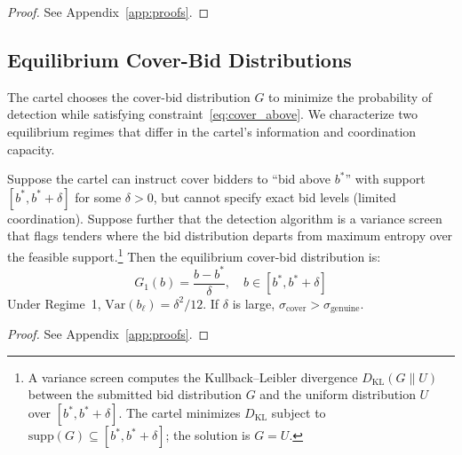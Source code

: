 \begin{proof}
See Appendix~\ref{app:proofs}.
\end{proof}


\subsection{Equilibrium Cover-Bid Distributions}
\label{sec:cover_distributions}

The cartel chooses the cover-bid distribution $G$ to minimize the
probability of detection while satisfying
constraint~\eqref{eq:cover_above}. We characterize two equilibrium
regimes that differ in the cartel's information and coordination
capacity.

\begin{proposition}
\label{prop:regime1}
Suppose the cartel can instruct cover bidders to ``bid above $b^*$''
with support $[b^*, b^* + \delta]$ for some $\delta > 0$, but cannot
specify exact bid levels (limited coordination). Suppose further that
the detection algorithm is a variance screen that flags tenders where
the bid distribution departs from maximum entropy over the feasible
support.\footnote{A variance screen computes the Kullback--Leibler
divergence $D_{\text{KL}}(G \| U)$ between the submitted bid
distribution $G$ and the uniform distribution $U$ over $[b^*, b^* +
\delta]$. The cartel minimizes $D_{\text{KL}}$ subject to
$\text{supp}(G) \subseteq [b^*, b^* + \delta]$; the solution is
$G = U$.} Then the equilibrium cover-bid distribution is:
\begin{equation}
  G_1(b) = \frac{b - b^*}{\delta}, \quad b \in [b^*, b^* + \delta]
  \label{eq:regime1}
\end{equation}
Under Regime~1, $\text{Var}(b_\ell) = \delta^2 / 12$. If $\delta$
is large, $\sigma_{\text{cover}} > \sigma_{\text{genuine}}$.
\end{proposition}

\begin{proof}
See Appendix~\ref{app:proofs}.
\end{proof}

